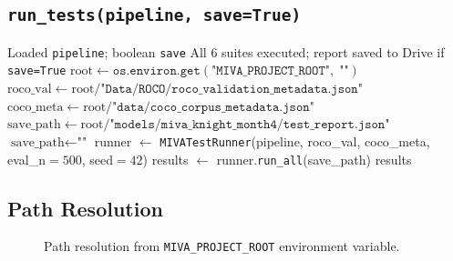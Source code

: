\documentclass[12pt,a4paper]{article}
\begin{document}
\subsection{\texttt{run\_tests(pipeline, save=True)}}

\begin{algorithm}[H]
\caption{\texttt{run\_tests(pipeline, save)} --- Colab convenience wrapper}
\label{alg:runtests}
\begin{algorithmic}[1]
\Require Loaded \texttt{pipeline}; boolean \texttt{save}
\Ensure All 6 suites executed; report saved to Drive if \texttt{save=True}
\State $\text{root} \gets \texttt{os.environ.get}(\texttt{"MIVA\_PROJECT\_ROOT"},\;\texttt{""})$
\State $\text{roco\_val}  \gets \text{root} / \texttt{"Data/ROCO/roco\_validation\_metadata.json"}$
\State $\text{coco\_meta} \gets \text{root} / \texttt{"data/coco\_corpus\_metadata.json"}$
  \State $\text{save\_path} \gets \text{root} / \texttt{"models/miva\_knight\_month4/test\_report.json"}$
\Else
  \State $\text{save\_path} \gets \texttt{""}$
\EndIf
\State runner $\gets$ \texttt{MIVATestRunner}(pipeline, roco\_val, coco\_meta, eval\_n$=500$, seed$=42$)
\State results $\gets$ runner.\texttt{run\_all}(save\_path)
\State \Return results
\end{algorithmic}
\end{algorithm}

\subsection{Path Resolution}

\begin{figure}[H]
\centering
{}
\caption{Path resolution from \texttt{MIVA\_PROJECT\_ROOT} environment variable.}
\label{fig:path-resolution}
\end{figure}
\end{document}
